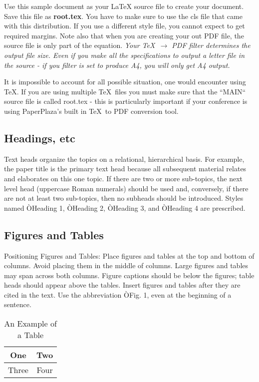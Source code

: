 \documentclass[letterpaper, 10 pt, conference]{ieeeconf}  %
\begin{document}
	Use this sample document as your LaTeX source file to create your document. Save this file as {\bf root.tex}. You have to make sure to use the cls file that came with this distribution. If you use a different style file, you cannot expect to get required margins. Note also that when you are creating your out PDF file, the source file is only part of the equation. {\it Your \TeX\ $\rightarrow$ PDF filter determines the output file size. Even if you make all the specifications to output a letter file in the source - if you filter is set to produce A4, you will only get A4 output. }
	
	It is impossible to account for all possible situation, one would encounter using \TeX. If you are using multiple \TeX\ files you must make sure that the ``MAIN`` source file is called root.tex - this is particularly important if your conference is using PaperPlaza's built in \TeX\ to PDF conversion tool.
	
	\subsection{Headings, etc}
	
	Text heads organize the topics on a relational, hierarchical basis. For example, the paper title is the primary text head because all subsequent material relates and elaborates on this one topic. If there are two or more sub-topics, the next level head (uppercase Roman numerals) should be used and, conversely, if there are not at least two sub-topics, then no subheads should be introduced. Styles named ÒHeading 1, ÒHeading 2, ÒHeading 3, and ÒHeading 4 are prescribed.
	
	\subsection{Figures and Tables}
	
	Positioning Figures and Tables: Place figures and tables at the top and bottom of columns. Avoid placing them in the middle of columns. Large figures and tables may span across both columns. Figure captions should be below the figures; table heads should appear above the tables. Insert figures and tables after they are cited in the text. Use the abbreviation ÒFig. 1, even at the beginning of a sentence.
	
	\begin{table}[h]
		\caption{An Example of a Table}
		\label{table_example}
		\begin{center}
			\begin{tabular}{|c||c|}
				\hline
				One & Two\\
				\hline
				Three & Four\\
				\hline
			\end{tabular}
		\end{center}
	\end{table}
	
\end{document}

